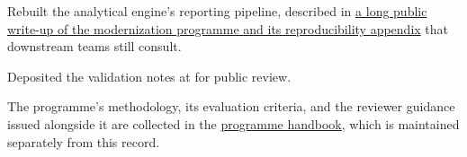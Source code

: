 \documentclass[medium=screen, fontsize=10pt, margin=narrow]{careerdossier-resume}
\begin{document}
\MakeCDossierHeader
{}
\begin{CDossierEntry}[
  title        = {Principal Data Scientist},
  organization = {Digital Services Laboratory},
  location     = {Ontario, Canada},
  dates        = {September 2024--Present}
]
  \begin{CDossierItemize}
    \item Rebuilt the analytical engine's reporting pipeline, described in
          \href{https://example.org/programs/analytics-modernization/2024/final-report/notes.html}{a
          long public write-up of the modernization programme and its
          reproducibility appendix} that downstream teams still consult.
    \item Deposited the validation notes at
          for public review.
  \end{CDossierItemize}
\end{CDossierEntry}

The programme's methodology, its evaluation criteria, and the reviewer guidance
issued alongside it are collected in the
\href{https://example.org/programs/analytics-modernization/handbook}{programme
handbook}, which is maintained separately from this record.
\end{document}
